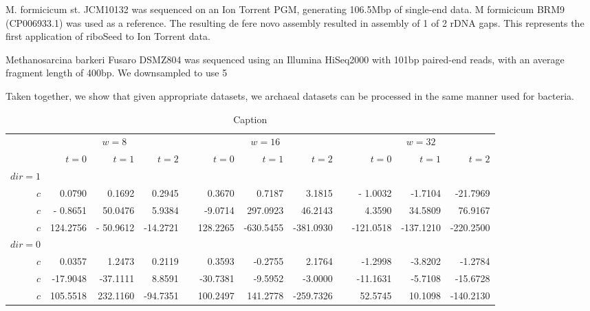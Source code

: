 \documentclass[11pt]{article}
\newcommand{\ra}[1]{\renewcommand{\arraystretch}{#1}}
\begin{document}
M. formicicum st. JCM10132 was sequenced on an Ion Torrent PGM, generating 106.5Mbp of single-end data. M formicicum BRM9 (CP006933.1) was used as a reference. The resulting de fere novo assembly resulted in assembly of 1 of 2 rDNA gaps. This represents the first application of riboSeed to Ion Torrent data.


Methanosarcina barkeri Fusaro DSMZ804 was sequenced using an Illumina HiSeq2000 with 101bp paired-end reads, with an average fragment length of 400bp. We downsampled to use 5%


Taken together, we show that given appropriate datasets, we archaeal datasets can be processed in the same manner used for bacteria.







\begin{table}
\centering
\ra{1.3}
\begin{tabular}{@{}rrrrcrrrcrrr@{}}\toprule &
\multicolumn{3}{c}{$w = 8$} & \phantom{abc} & \multicolumn{3}{c}{$w = 16$} & \phantom{abc} & \multicolumn{3}{c}{$w = 32$} \\
  \cmidrule{2-4} \cmidrule{6-8} \cmidrule{10-12} &
 $t=0$ & $t=1$ & $t=2$ && $t=0$ & $t=1$ & $t=2$ && $t=0$ & $t=1$ & $t=2$\\
\midrule
$dir=1$ \\
$c$ & 0.0790 & 0.1692 & 0.2945 && 0.3670 & 0.7187 & 3.1815 && - 1.0032 & -1.7104 & -21.7969 \\
$c$ &  - 0.8651  & 50.0476& 5.9384 & & -9.0714& 297.0923& 46.2143&& 4.3590& 34.5809& 76.9167 \\
$c$ & 124.2756& - 50.9612& -14.2721&& 128.2265& -630.5455& -381.0930&& -121.0518& -137.1210& -220.2500 \\
$dir=0$ \\
$c$ & 0.0357& 1.2473& 0.2119&& 0.3593& -0.2755& 2.1764&& -1.2998& -3.8202& -1.2784 \\
$c$ & -17.9048& -37.1111& 8.8591&& -30.7381& -9.5952& -3.0000&& -11.1631& -5.7108& -15.6728 \\
$c$ & 105.5518& 232.1160&
-94.7351&& 100.2497& 141.2778& -259.7326&& 52.5745& 10.1098& -140.2130\\
\bottomrule
\end{tabular}
\caption{Caption}
\end{table}
\end{document}
